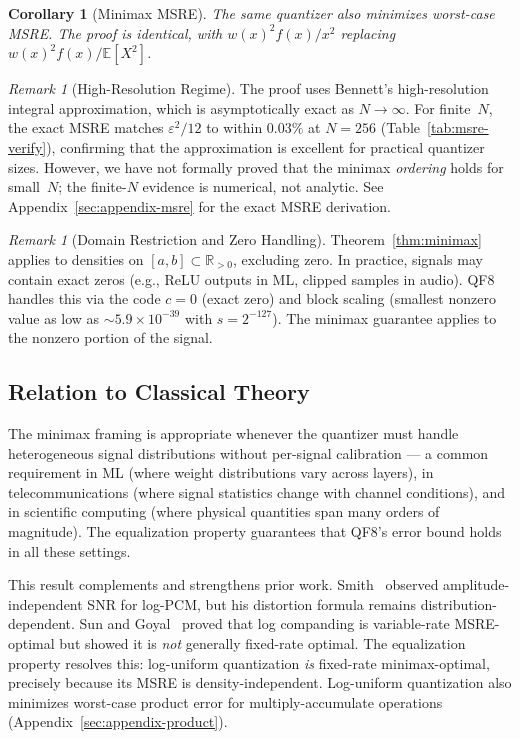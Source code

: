 \documentclass[11pt,letterpaper]{article}
\newtheorem{corollary}[theorem]{Corollary}
\theoremstyle{definition}
\theoremstyle{remark}
\newtheorem{remark}[theorem]{Remark}
\newcommand{\E}{\mathbb{E}}
\newcommand{\R}{\mathbb{R}}
\begin{document}
\begin{corollary}[Minimax MSRE]
\label{cor:minimax-msre}
The same quantizer also minimizes worst-case MSRE.
The proof is identical, with $w(x)^2 f(x)/x^2$ replacing
$w(x)^2 f(x)/\E[X^2]$.
\end{corollary}

\begin{remark}[High-Resolution Regime]
The proof uses Bennett's high-resolution integral approximation, which is
asymptotically exact as $N \to \infty$.
For finite~$N$, the exact MSRE matches $\varepsilon^2/12$ to within $0.03\%$ at
$N = 256$ (Table~\ref{tab:msre-verify}), confirming that the approximation is
excellent for practical quantizer sizes.
However, we have not formally proved that the minimax \emph{ordering} holds for
small~$N$; the finite-$N$ evidence is numerical, not analytic.
See Appendix~\ref{sec:appendix-msre} for the exact MSRE derivation.
\end{remark}

\begin{remark}[Domain Restriction and Zero Handling]
\label{rem:zero-handling}
Theorem~\ref{thm:minimax} applies to densities on $[a,b] \subset \R_{>0}$,
excluding zero.
In practice, signals may contain exact zeros (e.g., ReLU outputs in ML, clipped
samples in audio).
QF8 handles this via the code $c = 0$ (exact zero) and block scaling
(smallest nonzero value as low as ${\sim}5.9 \times 10^{-39}$ with
$s = 2^{-127}$).
The minimax guarantee applies to the nonzero portion of the signal.
\end{remark}

\subsection{Relation to Classical Theory}
\label{subsec:classical}

The minimax framing is appropriate whenever the quantizer must handle
heterogeneous signal distributions without per-signal calibration --- a common
requirement in ML (where weight distributions vary across layers), in
telecommunications (where signal statistics change with channel conditions), and
in scientific computing (where physical quantities span many orders of
magnitude).
The equalization property guarantees that QF8's error bound holds in all these
settings.

This result complements and strengthens prior work.
Smith~\cite{smith1957} observed amplitude-independent SNR for log-PCM, but his
distortion formula remains distribution-dependent.
Sun and Goyal~\cite{sun2011} proved that log companding is variable-rate MSRE-optimal but
showed it is \emph{not} generally fixed-rate optimal.
The equalization property resolves this: log-uniform quantization \emph{is}
fixed-rate minimax-optimal, precisely because its MSRE is density-independent.
Log-uniform quantization also minimizes worst-case product error for
multiply-accumulate operations (Appendix~\ref{sec:appendix-product}).
\end{document}

